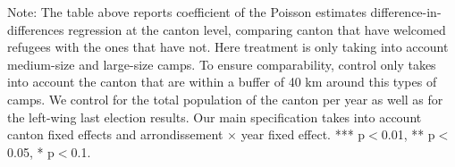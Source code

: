 \begin{table}[h!]
    \centering
    \caption{Association Creations, by Type, pre- and post- WWII}
    \resizebox{\textwidth}{!}{}
    \label{tab:att_associations_large_medium}
    \par
        \begin{minipage}{\textwidth}
        \vspace{0.5em}
            \footnotesize
            Note: The table above reports coefficient of the Poisson estimates difference-in-differences regression at the canton level, comparing canton that have welcomed refugees with the ones that have not. Here treatment is only taking into account medium-size and large-size camps. To ensure comparability, control only takes into account the canton that are within a buffer of 40 km around this types of camps. We control for the total population of the canton per year as well as for the left-wing last election results. Our main specification takes into account canton fixed effects and arrondissement $\times$ year fixed effect. *** p$<$0.01, ** p$<$0.05, * p$<$0.1.
        \end{minipage}
\end{table}


